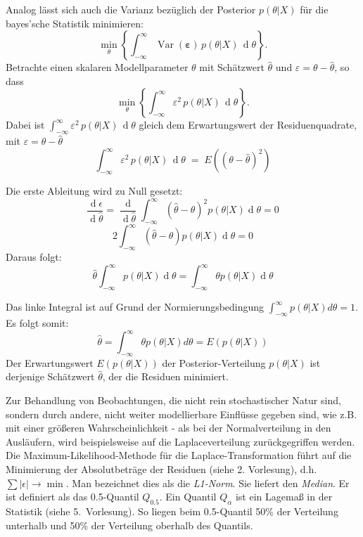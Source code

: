 Analog lässt sich auch die Varianz bezüglich der Posterior $p(\theta|X)$ für die bayes'sche Statistik minimieren:
\begin{equation}
\min_{\theta} \left\{ \int_{-\infty}^{\infty} \operatorname{Var}(\boldsymbol \varepsilon)  \, p(\theta|X) \, \operatorname d \theta \right\} .
\end{equation}
Betrachte einen skalaren Modellparameter $\theta$ mit Schätzwert $\hat \theta$ und $\varepsilon = \theta - \hat \theta$, so dass
\begin{equation}
\min_{\theta} \left\{ \int_{-\infty}^{\infty} \varepsilon^2  \, p(\theta|X) \, \operatorname d \theta \right\} .
\end{equation}
Dabei ist $\int_{-\infty}^{\infty} \varepsilon^2  \, p(\theta|X) \, \operatorname d \theta$ gleich dem Erwartungswert der 
Residuenquadrate, mit $\varepsilon = \theta - \hat \theta$
$$
\int_{-\infty}^{\infty} \varepsilon^2  \, p(\theta|X) \, \operatorname d \theta \;
= \; E( (\theta - \hat \theta)^2 )
$$

Die erste Ableitung wird zu Null gesetzt:
\begin{equation}  
\frac{\operatorname d \epsilon}{\operatorname d \hat\theta } = \frac{\operatorname d}{\operatorname d \hat\theta } \int_{-\infty}^{\infty}
(\hat\theta - \theta)^2 p(\theta|X) \operatorname d\theta = 0 
\end{equation}
\[
2 \int_{-\infty}^{\infty} (\hat\theta - \theta) p(\theta|X) \operatorname d\theta = 0
\]
Daraus folgt: 
\[
\hat\theta \int_{-\infty}^{\infty} p(\theta|X) \operatorname d\theta = \int_{-\infty}^{\infty} \theta p(\theta|X) \operatorname d \theta
\]

Das linke Integral ist auf Grund der Normierungsbedingung $\int_{-\infty}^{\infty} p(\theta|X) d\theta = 1$. Es folgt somit: 
\begin{equation}
\hat\theta = \int_{-\infty}^{\infty} \theta p(\theta|X) d \theta = E(p(\theta|X))
\end{equation}
Der Erwartungswert $E(p(\theta|X))$ der Posterior-Verteilung $p(\theta|X)$ ist derjenige Schätzwert
$\hat{\theta}$, der die Residuen minimiert. 

Zur Behandlung von Beobachtungen, die nicht rein stochastischer Natur sind, sondern durch andere, nicht weiter
modellierbare Einflüsse gegeben sind, wie z.B. mit einer größeren Wahrscheinlichkeit - als bei der Normalverteilung in den
Ausläufern, wird beispielsweise auf die Laplaceverteilung zurückgegriffen werden. Die Maximum-Likelihood-Methode für die Laplace-Transformation führt auf die Minimierung der Absolutbeträge der Residuen (siehe 2. Vorlesung),
d.h. $\sum \left|\epsilon \right| \rightarrow \min$. Man bezeichnet dies
als die \textit{L1-Norm}. Sie liefert den \textit{Median}. Er ist 
definiert als das 0.5-Quantil $Q_{0.5}$. Ein Quantil $Q_\alpha$ ist ein Lagemaß in der Statistik (siehe 5.~Vorlesung). So liegen beim 0.5-Quantil 50\% der Verteilung unterhalb und 50\% der Verteilung oberhalb des Quantils.

